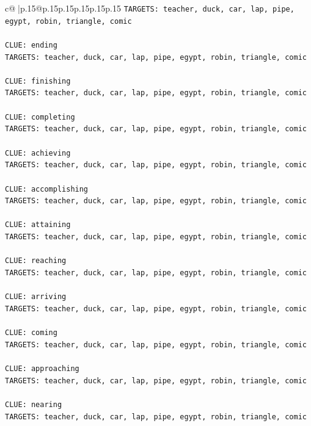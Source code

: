 \documentclass{article}
\begin{document}
{\begin{supertabular}{c@{$\;$}|p{.15\linewidth}@{}p{.15\linewidth}p{.15\linewidth}p{.15\linewidth}p{.15\linewidth}p{.15\linewidth}}
{{{\texttt{TARGETS: teacher, duck, car, lap, pipe, egypt, robin, triangle, comic} \\
\\ 
\texttt{CLUE: ending} \\
\texttt{TARGETS: teacher, duck, car, lap, pipe, egypt, robin, triangle, comic} \\
\\ 
\texttt{CLUE: finishing} \\
\texttt{TARGETS: teacher, duck, car, lap, pipe, egypt, robin, triangle, comic} \\
\\ 
\texttt{CLUE: completing} \\
\texttt{TARGETS: teacher, duck, car, lap, pipe, egypt, robin, triangle, comic} \\
\\ 
\texttt{CLUE: achieving} \\
\texttt{TARGETS: teacher, duck, car, lap, pipe, egypt, robin, triangle, comic} \\
\\ 
\texttt{CLUE: accomplishing} \\
\texttt{TARGETS: teacher, duck, car, lap, pipe, egypt, robin, triangle, comic} \\
\\ 
\texttt{CLUE: attaining} \\
\texttt{TARGETS: teacher, duck, car, lap, pipe, egypt, robin, triangle, comic} \\
\\ 
\texttt{CLUE: reaching} \\
\texttt{TARGETS: teacher, duck, car, lap, pipe, egypt, robin, triangle, comic} \\
\\ 
\texttt{CLUE: arriving} \\
\texttt{TARGETS: teacher, duck, car, lap, pipe, egypt, robin, triangle, comic} \\
\\ 
\texttt{CLUE: coming} \\
\texttt{TARGETS: teacher, duck, car, lap, pipe, egypt, robin, triangle, comic} \\
\\ 
\texttt{CLUE: approaching} \\
\texttt{TARGETS: teacher, duck, car, lap, pipe, egypt, robin, triangle, comic} \\
\\ 
\texttt{CLUE: nearing} \\
\texttt{TARGETS: teacher, duck, car, lap, pipe, egypt, robin, triangle, comic} \\
}}}
\end{supertabular}}
\end{document}
